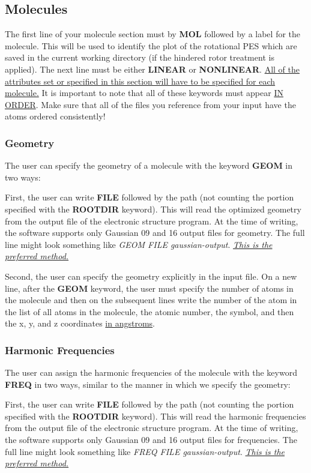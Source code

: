 \documentclass[a4paper,12pt]{article}
\begin{document}
\subsection{Molecules}
The first line of your molecule section must by \textbf{MOL} followed by a label for the molecule. This will be used to identify the plot of the rotational PES which are saved in the current working directory (if the hindered rotor treatment is applied). The next line must be either \textbf{LINEAR} or \textbf{NONLINEAR}. \underline{All of the attributes set or specified in this section will have to be specified for each molecule.} It is important to note that all of these keywords must appear \underline{IN ORDER}. Make sure that all of the files you reference from your input have the atoms ordered consistently!

\subsubsection{Geometry}
The user can specify the geometry of a molecule with the keyword \textbf{GEOM} in two ways:

First, the user can write \textbf{FILE} followed by the path (not counting the portion specified with the \textbf{ROOTDIR} keyword). This will read the optimized geometry from the output file of the electronic structure program.
At the time of writing, the software supports only Gaussian 09 and 16 output files for geometry. The full line might look something like \textit{GEOM FILE gaussian-output}. \underline{\textit{This is the preferred method.}}

Second, the user can specify the geometry explicitly in the input file. On a new line, after the \textbf{GEOM} keyword, the user must specify the number of atoms in the molecule and then on the subsequent lines write the number of the atom in the list of all atoms in the molecule, the atomic number, the symbol, and then the x, y, and z coordinates \underline{in angstroms}.

\subsubsection{Harmonic Frequencies}
The user can assign the harmonic frequencies of the molecule with the keyword \textbf{FREQ} in two ways, similar to the manner in which we specify the geometry:

First, the user can write \textbf{FILE} followed by the path (not counting the portion specified with the \textbf{ROOTDIR} keyword). This will read the harmonic frequencies from the output file of the electronic structure program.
At the time of writing, the software supports only Gaussian 09 and 16 output files for frequencies. The full line might look something like \textit{FREQ FILE gaussian-output}. \underline{\textit{This is the preferred method.}}
\end{document}
